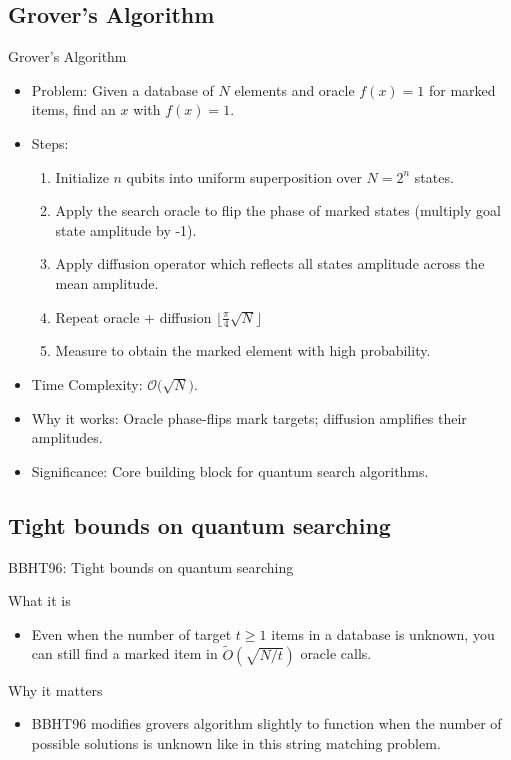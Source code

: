 \documentclass{beamer}
\begin{document}
\subsection{Grover's Algorithm}
\begin{frame}{Grover's Algorithm}
    \begin{itemize}
        \item Problem: Given a database of \(N\) elements and oracle \(f(x)=1\) for marked items, find an \(x\) with \(f(x)=1\).
        \item Steps:
              \begin{enumerate}
                  \item Initialize \(n\) qubits into uniform superposition over \(N=2^n\) states.
                  \item Apply the search oracle to flip the phase of marked states (multiply goal state amplitude by -1).
                  \item Apply diffusion operator which reflects all states amplitude across the mean amplitude.
                  \item Repeat oracle + diffusion \(\bigl\lfloor\frac{\pi}{4}\sqrt{N}\bigr\rfloor\)
                  \item Measure to obtain the marked element with high probability.
              \end{enumerate}
        \item Time Complexity: \(\mathcal{O}\!\bigl(\sqrt{N}\bigr)\).
        \item Why it works: Oracle phase-flips mark targets; diffusion amplifies their amplitudes.
        \item Significance: Core building block for quantum search algorithms.
    \end{itemize}
\end{frame}
\subsection{Tight bounds on quantum searching}
\begin{frame}{BBHT96: Tight bounds on quantum searching}
    \begin{block}{What it is}
        \begin{itemize}
            \item Even when the number of target \(t \ge 1\) items in a database is unknown,
                  you can still find a marked item in \(\tilde O(\sqrt{N/t})\) oracle calls.

        \end{itemize}
    \end{block}
    \begin{block}{Why it matters}
        \begin{itemize}
            \item BBHT96 modifies grovers algorithm slightly to function when the number of possible solutions is unknown like in this string matching problem.
        \end{itemize}
    \end{block}
\end{frame}
\end{document}
